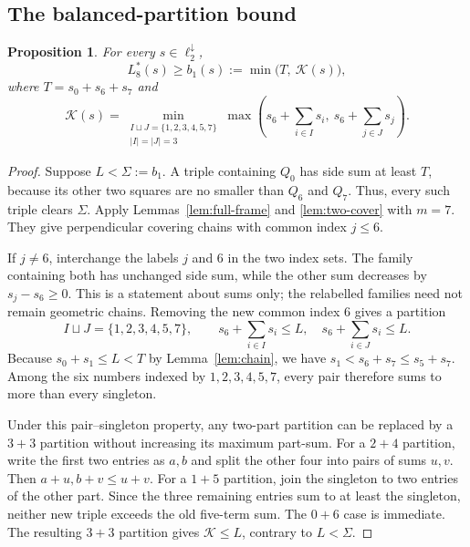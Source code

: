 \documentclass[12pt]{amsart}
\newtheorem{proposition}[theorem]{Proposition}
\theoremstyle{definition}
\theoremstyle{remark}
\numberwithin{equation}{section}
\numberwithin{figure}{section}
\numberwithin{table}{section}
\newcommand{\KK}{\mathcal K}
\begin{document}
\subsection{The balanced-partition bound}
\begin{proposition}\label{prop:ell1}
For every $s\in\ell_2^\downarrow$,
\[
L_8^*(s)\ge b_1(s):=\min\bigl(T,\ \mathcal K(s)\bigr),
\]
where $T=s_0+s_6+s_7$ and
\[
\mathcal K(s)=\min_{\substack{I\sqcup J=\{1,2,3,4,5,7\}\\|I|=|J|=3}}
\max\left(s_6+\sum_{i\in I}s_i,\ s_6+\sum_{j\in J}s_j\right).
\]
\end{proposition}
\begin{proof}
Suppose $L<\Sigma:=b_1$.
A triple containing $Q_0$ has side sum at least $T$, because its other two
squares are no smaller than $Q_6$ and $Q_7$. Thus, every such triple clears
$\Sigma$. Apply Lemmas~\ref{lem:full-frame} and
\ref{lem:two-cover} with $m=7$. They give perpendicular covering chains
with common index $j\le6$.

If $j\ne6$, interchange the labels $j$ and $6$ in the two index
sets. The family containing both has unchanged side sum, while the
other sum decreases by $s_j-s_6\ge0$. This is a statement about sums only;
the relabelled families need not remain geometric chains. Removing the
new common index $6$ gives a partition
\[
I\sqcup J=\{1,2,3,4,5,7\},\qquad
s_6+\sum_{i\in I}s_i\le L,\quad s_6+\sum_{i\in J}s_i\le L.
\]
Because $s_0+s_1\le L<T$ by Lemma~\ref{lem:chain}, we have $s_1<s_6+s_7\le s_5+s_7$.
Among the six numbers indexed by $1,2,3,4,5,7$, every pair therefore sums
to more than every singleton.

Under this pair--singleton property, any two-part partition can be
replaced by a $3+3$ partition without increasing its maximum part-sum.
For a $2+4$ partition, write the first two entries as $a,b$ and split the
other four into pairs of sums $u,v$. Then $a+u,b+v\le u+v$. For a $1+5$
partition, join the singleton to two entries of the other part. Since the three
remaining entries sum to at least the singleton, neither new triple
exceeds the old five-term sum. The $0+6$ case is immediate.
The resulting $3+3$ partition gives $\KK\le L$, contrary to $L<\Sigma$.
\end{proof}
\end{document}
